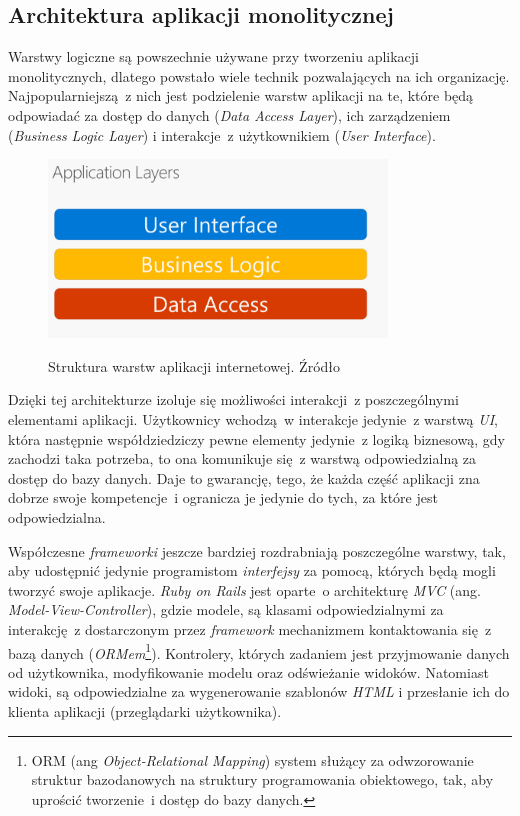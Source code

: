 \subsection{Architektura aplikacji monolitycznej}
Warstwy logiczne są powszechnie używane przy tworzeniu aplikacji monolitycznych, dlatego powstało wiele technik pozwalających na ich organizację\cite{msbuild}. Najpopularniejszą~z nich jest podzielenie warstw aplikacji na te, które będą odpowiadać za dostęp do danych (\textit{Data Access Layer}), ich zarządzeniem (\textit{Business Logic Layer}) i interakcje~z użytkownikiem (\textit{User Interface}).
\begin{figure}[h!]
	\centering
		\includegraphics[width=9cm]{Rysunki/Rozdzial1/warstwyAplikacji.png}
		\label{fig:warstwyAplikacji}
	\caption{Struktura warstw aplikacji internetowej. Źródło \cite{msbuild}}
\end{figure}

Dzięki tej architekturze izoluje się możliwości interakcji~z poszczególnymi elementami aplikacji. Użytkownicy wchodzą~w interakcje jedynie~z warstwą \textit{UI}, która następnie współdziedziczy pewne elementy jedynie~z logiką biznesową, gdy zachodzi taka potrzeba, to ona komunikuje się~z warstwą odpowiedzialną za dostęp do bazy danych. Daje to gwarancję, tego, że każda część aplikacji zna dobrze swoje kompetencje~i ogranicza je jedynie do tych, za które jest odpowiedzialna\cite{msbuild}.

Współczesne \textit{frameworki} jeszcze bardziej rozdrabniają poszczególne warstwy, tak, aby udostępnić jedynie programistom \textit{interfejsy} za pomocą, których będą mogli tworzyć swoje aplikacje. \textit{Ruby on Rails} jest oparte~o architekturę \textit{MVC} (ang. \textit{Model-View-Controller}), gdzie modele, są klasami odpowiedzialnymi za interakcję~z dostarczonym przez \textit{framework} mechanizmem kontaktowania się~z bazą danych (\textit{ORMem}\footnote{ORM (ang \textit{Object-Relational Mapping}) system służący za odwzorowanie struktur bazodanowych na struktury programowania obiektowego, tak, aby uprościć tworzenie~i dostęp do bazy danych.}). Kontrolery, których zadaniem jest przyjmowanie danych od użytkownika, modyfikowanie modelu oraz odświeżanie widoków. Natomiast widoki, są odpowiedzialne za wygenerowanie szablonów \textit{HTML} i przesłanie ich do klienta aplikacji (przeglądarki użytkownika)\cite{ruby}.

